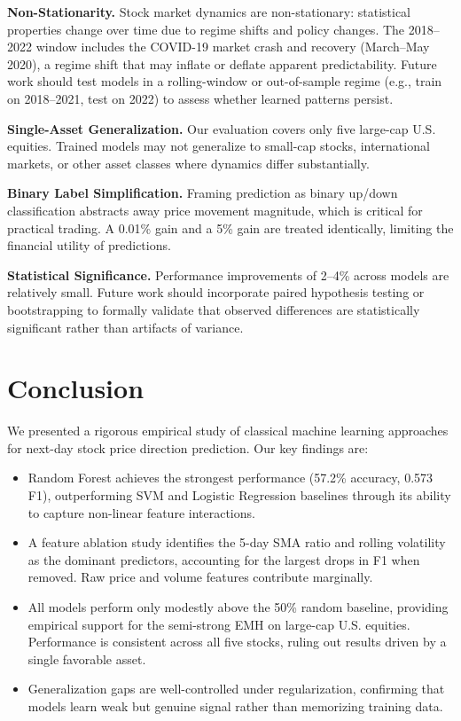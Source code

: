 \documentclass{article}
\begin{document}
\textbf{Non-Stationarity.} Stock market dynamics are non-stationary: statistical
properties change over time due to regime shifts and policy changes. The 2018--
2022 window includes the COVID-19 market crash and recovery (March--May 2020), a
regime shift that may inflate or deflate apparent predictability. Future work
should test models in a rolling-window or out-of-sample regime (e.g., train on
2018--2021, test on 2022) to assess whether learned patterns persist.

\textbf{Single-Asset Generalization.} Our evaluation covers only five large-cap
U.S. equities. Trained models may not generalize to small-cap stocks,
international markets, or other asset classes where dynamics differ
substantially.

\textbf{Binary Label Simplification.} Framing prediction as binary up/down
classification abstracts away price movement magnitude, which is critical for
practical trading. A 0.01\% gain and a 5\% gain are treated identically,
limiting the financial utility of predictions.

\textbf{Statistical Significance.} Performance improvements of 2--4\% across
models are relatively small. Future work should incorporate paired hypothesis
testing or bootstrapping to formally validate that observed differences are
statistically significant rather than artifacts of variance.

\section{Conclusion}

We presented a rigorous empirical study of classical machine learning approaches
for next-day stock price direction prediction. Our key findings are:

\begin{itemize}
    \item Random Forest achieves the strongest performance (57.2\% accuracy,
    0.573 F1), outperforming SVM and Logistic Regression baselines through its
    ability to capture non-linear feature interactions.

    \item A feature ablation study identifies the 5-day SMA ratio and rolling
    volatility as the dominant predictors, accounting for the largest drops in
    F1 when removed. Raw price and volume features contribute marginally.

    \item All models perform only modestly above the 50\% random baseline,
    providing empirical support for the semi-strong EMH on large-cap U.S.
    equities. Performance is consistent across all five stocks, ruling out
    results driven by a single favorable asset.

    \item Generalization gaps are well-controlled under regularization,
    confirming that models learn weak but genuine signal rather than memorizing
    training data.
\end{itemize}
\end{document}
